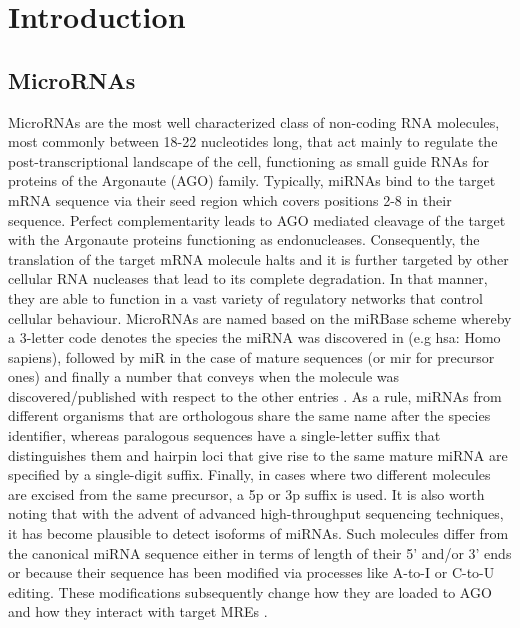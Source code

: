 \documentclass[en,ack]{dimscthesis}
\begin{document}
\frontmatter

\mainmatter

\chapter{Introduction} \label{Introduction}

\section{MicroRNAs} \label{MicroRNAs}
\par MicroRNAs are the most well characterized class of non-coding RNA molecules, most commonly between 18-22 nucleotides long, that act mainly to regulate the post-transcriptional landscape of the cell, functioning as small guide RNAs for proteins of the Argonaute (AGO) family. Typically, miRNAs bind to the target mRNA sequence via their seed region which covers positions 2-8 in their sequence. Perfect complementarity leads to AGO mediated cleavage of the target with the Argonaute proteins functioning as endonucleases. Consequently, the translation of the target mRNA molecule halts and it is further targeted by other cellular RNA nucleases that lead to its complete degradation. In that manner, they are able to function in a vast variety of regulatory networks that control cellular behaviour. MicroRNAs are named based on the miRBase scheme whereby a 3-letter code denotes the species the miRNA was discovered in (e.g hsa: Homo sapiens), followed by miR in the case of mature sequences (or mir for precursor ones) and finally a number that conveys when the molecule was discovered/published with respect to the other entries \parencite{ambrosUniformSystemMicroRNA2003,kozomaraMiRBaseIntegratingMicroRNA2011}. As a rule, miRNAs from different organisms that are orthologous share the same name after the species identifier, whereas paralogous sequences have a single-letter suffix that distinguishes them and hairpin loci that give rise to the same mature miRNA are specified by a single-digit suffix. Finally, in cases where two different molecules are excised from the same precursor, a 5p or 3p suffix is used. It is also worth noting that with the advent of advanced high-throughput sequencing techniques, it has become plausible to detect isoforms of miRNAs. Such molecules differ from the canonical miRNA sequence either in terms of length of their 5' and/or 3' ends or because their sequence has been modified via processes like A-to-I or C-to-U editing. These modifications subsequently change how they are loaded to AGO and how they interact with target MREs \parencite{tomaselloMicroRNAFamilyGets2021}.
\end{document}
